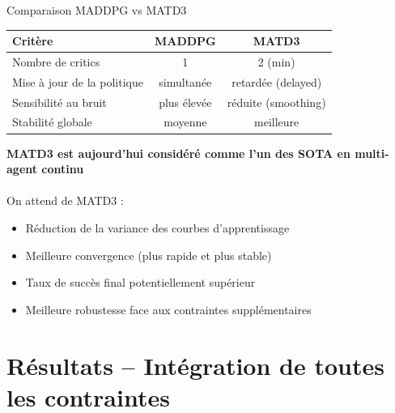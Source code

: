 \documentclass[aspectratio=169]{beamer}
\begin{document}
\begin{frame}{Comparaison MADDPG vs MATD3}
\begin{table}[]
\footnotesize
\centering
\begin{tabular}{lcc}
\toprule
Critère                  & MADDPG              & MATD3                  \\
\midrule
Nombre de critics        & 1                   & 2 (min)                \\
Mise à jour de la politique & simultanée          & retardée (delayed)     \\
Sensibilité au bruit     & plus élevée         & réduite (smoothing)    \\
Stabilité globale        & moyenne             & meilleure              \\
\bottomrule
\end{tabular}
\end{table}

\centering
\textbf{MATD3 est aujourd'hui considéré comme l'un des SOTA en multi-agent continu}\\

\\
On attend de MATD3 :

\begin{itemize}
    \item Réduction de la variance des courbes d'apprentissage
    \item Meilleure convergence (plus rapide et plus stable)
    \item Taux de succès final potentiellement supérieur
    \item Meilleure robustesse face aux contraintes supplémentaires
\end{itemize}

\end{frame}


\section{Résultats – Intégration de toutes les contraintes}
\end{document}
